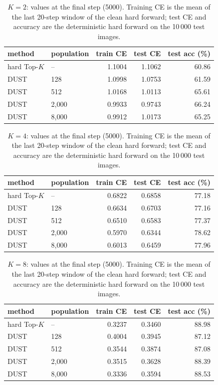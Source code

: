 \begin{table}[H]
\centering
\caption{$K = 2$: values at the final step (5000). Training CE is the mean of the last 20-step window of the clean hard forward; test CE and accuracy are the deterministic hard forward on the 10\,000 test images.}
\label{tab:k2}
\begin{tabular}{llrrr}
\toprule
    method & population & train CE & test CE & test acc (\%) \\
\midrule
    hard Top-$K$ & -- & 1.1004 & 1.1062 & 60.86 \\
    DUST & 128 & 1.0998 & 1.0753 & 61.59 \\
    DUST & 512 & 1.0168 & 1.0113 & 65.61 \\
    DUST & 2,000 & 0.9933 & 0.9743 & 66.24 \\
    DUST & 8,000 & 0.9912 & 1.0173 & 65.25 \\
\bottomrule
\end{tabular}
\end{table}

\begin{table}[H]
\centering
\caption{$K = 4$: values at the final step (5000). Training CE is the mean of the last 20-step window of the clean hard forward; test CE and accuracy are the deterministic hard forward on the 10\,000 test images.}
\label{tab:k4}
\begin{tabular}{llrrr}
\toprule
    method & population & train CE & test CE & test acc (\%) \\
\midrule
    hard Top-$K$ & -- & 0.6822 & 0.6858 & 77.18 \\
    DUST & 128 & 0.6634 & 0.6703 & 77.16 \\
    DUST & 512 & 0.6510 & 0.6583 & 77.37 \\
    DUST & 2,000 & 0.5970 & 0.6344 & 78.62 \\
    DUST & 8,000 & 0.6013 & 0.6459 & 77.96 \\
\bottomrule
\end{tabular}
\end{table}

\begin{table}[H]
\centering
\caption{$K = 8$: values at the final step (5000). Training CE is the mean of the last 20-step window of the clean hard forward; test CE and accuracy are the deterministic hard forward on the 10\,000 test images.}
\label{tab:k8}
\begin{tabular}{llrrr}
\toprule
    method & population & train CE & test CE & test acc (\%) \\
\midrule
    hard Top-$K$ & -- & 0.3237 & 0.3460 & 88.98 \\
    DUST & 128 & 0.4004 & 0.3945 & 87.12 \\
    DUST & 512 & 0.3544 & 0.3874 & 87.08 \\
    DUST & 2,000 & 0.3515 & 0.3628 & 88.39 \\
    DUST & 8,000 & 0.3336 & 0.3594 & 88.53 \\
\bottomrule
\end{tabular}
\end{table}

